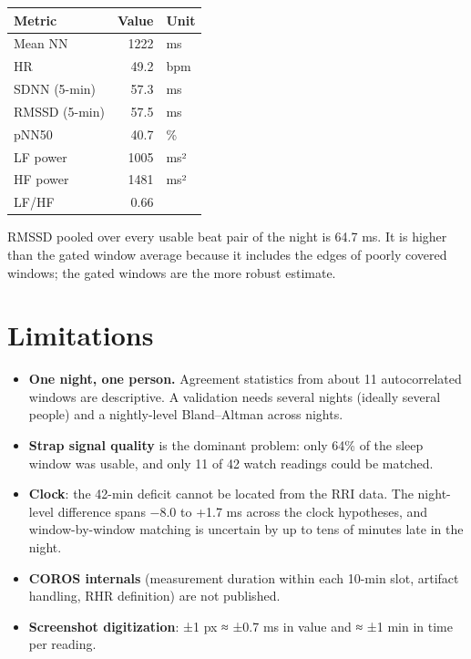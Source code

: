 \documentclass[11pt,a4paper]{article}
\begin{document}
\begin{center}
\small
\begin{tabular}{lrl}
\toprule
\textbf{Metric} & \textbf{Value} & \textbf{Unit} \\
\midrule
Mean NN & 1222 & ms \\
HR & 49.2 & bpm \\
SDNN (5-min) & 57.3 & ms \\
RMSSD (5-min) & 57.5 & ms \\
pNN50 & 40.7 & \% \\
LF power & 1005 & ms² \\
HF power & 1481 & ms² \\
LF/HF & 0.66 &  \\
\bottomrule
\end{tabular}
\end{center}
RMSSD pooled over every usable beat pair of the night is 64.7 ms. It is higher than the gated window average because it includes the edges of poorly covered windows; the gated windows are the more robust estimate.

\section{Limitations}\label{sec:limitations}
\begin{itemize}
\item \textbf{One night, one person.} Agreement statistics from about 11 autocorrelated windows are descriptive. A validation needs several nights (ideally several people) and a nightly-level Bland–Altman across nights.
\item \textbf{Strap signal quality} is the dominant problem: only 64\% of the sleep window was usable, and only 11 of 42 watch readings could be matched.
\item \textbf{Clock}: the 42-min deficit cannot be located from the RRI data. The night-level difference spans −8.0 to +1.7 ms across the clock hypotheses, and window-by-window matching is uncertain by up to tens of minutes late in the night.
\item \textbf{COROS internals} (measurement duration within each 10-min slot, artifact handling, RHR definition) are not published.
\item \textbf{Screenshot digitization}: ±1 px ≈ ±0.7 ms in value and ≈ ±1 min in time per reading.
\end{itemize}
\end{document}
